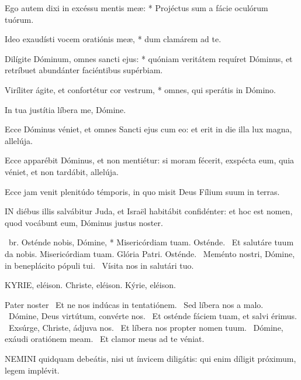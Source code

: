 Ego autem dixi in excéssu mentis meæ: * Projéctus sum a fácie oculórum tuórum.

Ideo exaudísti vocem oratiónis meæ, * dum clamárem ad te.

Dilígite Dóminum, omnes sancti ejus: * quóniam veritátem requíret Dóminus, et retríbuet abundánter faciéntibus supérbiam.

Viríliter ágite, et confortétur cor vestrum, * omnes, qui sperátis in Dómino.

  In tua justítia líbera me, Dómine.


  Ecce Dóminus véniet, et omnes Sancti ejus cum eo: et erit in die illa lux magna, allelúja.

  Ecce apparébit Dóminus, et non mentiétur: si moram fécerit, exspécta eum, quia véniet, et non tardábit, allelúja.

  Ecce jam venit plenitúdo témporis, in quo misit Deus Fílium suum in terras.


\lettrine[lines=2]{I}{N} diébus illis salvábitur Juda, et Israël habitábit confidénter: et hoc est nomen, quod vocábunt eum, Dóminus justus noster.

\R\ br. Osténde nobis, Dómine, * Misericórdiam tuam. Osténde. \V\ Et salutáre tuum da nobis. Misericórdiam tuam. Glória Patri. Osténde. \V\ Meménto nostri, Dómine, in beneplácito pópuli tui. \R\ Vísita nos in salutári tuo.


KYRIE, eléison. Christe, eléison. Kýrie, eléison.

Pater noster  \V\ Et ne nos indúcas in tentatiónem. \R\ Sed líbera nos a malo. \V\ Dómine, Deus virtútum, convérte nos. \R\ Et osténde fáciem tuam, et salvi érimus. \V\ Exsúrge, Christe, ádjuva nos. \R\ Et líbera nos propter nomen tuum. \V\ Dómine, exáudi oratiónem meam. \R\ Et clamor meus ad te véniat.



\lettrine[lines=2]{N}{EMINI} quidquam debeátis, nisi ut ínvicem diligátis: qui enim díligit próximum, legem implévit.

